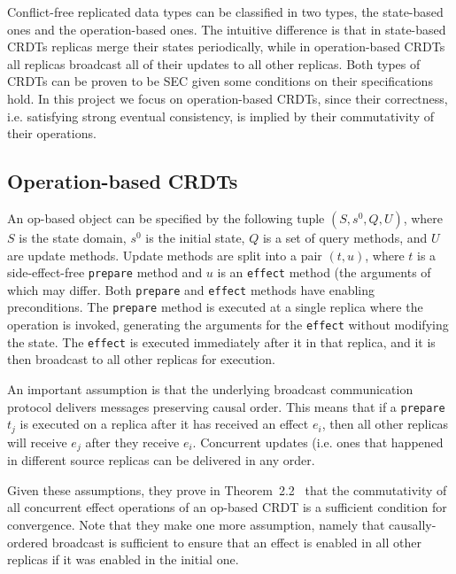\documentclass{article}
\begin{document}
Conflict-free replicated data types can be classified in two types,
the state-based ones and the operation-based ones. The intuitive
difference is that in state-based CRDTs replicas merge their states
periodically, while in operation-based CRDTs all replicas broadcast
all of their updates to all other replicas. Both types of CRDTs can be
proven to be SEC given some conditions on their specifications
hold. In this project we focus on operation-based CRDTs, since their
correctness, i.e. satisfying strong eventual consistency, is implied
by their commutativity of their operations.

\subsection{Operation-based CRDTs}

An op-based object can be specified by the following tuple $(S, s^0,
Q, U)$, where $S$ is the state domain, $s^0$ is the initial state, $Q$
is a set of query methods, and $U$ are update methods. Update methods
are split into a pair $(t,u)$, where $t$ is a side-effect-free
\texttt{prepare} method and $u$ is an \texttt{effect} method (the
arguments of which may differ. Both \texttt{prepare} and
\texttt{effect} methods have enabling preconditions. The
\texttt{prepare} method is executed at a single replica where the
operation is invoked, generating the arguments for the \texttt{effect}
without modifying the state. The \texttt{effect} is executed
immediately after it in that replica, and it is then broadcast to all
other replicas for execution.

An important assumption is that the underlying broadcast communication
protocol delivers messages preserving causal order. This means that if
a \texttt{prepare} $t_j$ is executed on a replica after it has
received an effect $e_i$, then all other replicas will receive $e_j$
after they receive $e_i$. Concurrent updates (i.e. ones that happened
in different source replicas can be delivered in any order.

Given these assumptions, they prove in
Theorem~2.2~\cite{shapiro2011conflict} that the commutativity of all
concurrent effect operations of an op-based CRDT is a sufficient
condition for convergence. Note that they make one more assumption,
namely that causally-ordered broadcast is sufficient to ensure that an
effect is enabled in all other replicas if it was enabled in the
initial one.

\end{document}
